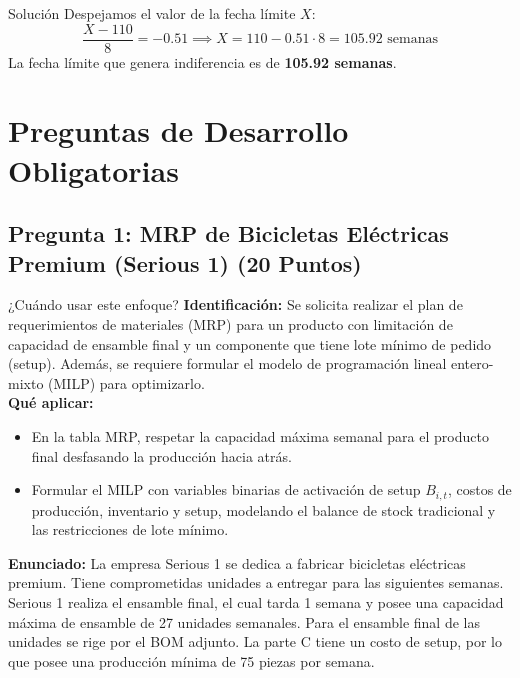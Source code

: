\documentclass[11pt, a4paper]{article}
\begin{document}
\begin{ejercicio}{Solución}
  Despejamos el valor de la fecha límite $X$:
  \begin{equation*}
    \frac{X - 110}{8} = -0.51 \implies X = 110 - 0.51 \cdot 8 = 105.92 \text{ semanas}
  \end{equation*}
  La fecha límite que genera indiferencia es de \textbf{105.92 semanas}.

\end{ejercicio}

\newpage

\section{Preguntas de Desarrollo Obligatorias}

\subsection*{Pregunta 1: MRP de Bicicletas Eléctricas Premium (Serious 1) (20 Puntos)}

  \begin{tipprueba}{¿Cuándo usar este enfoque?}
    \textbf{Identificación:} Se solicita realizar el plan de requerimientos de materiales (MRP) para un producto con limitación de capacidad de ensamble final y un componente que tiene lote mínimo de pedido (setup). Además, se requiere formular el modelo de programación lineal entero-mixto (MILP) para optimizarlo.\\
    \textbf{Qué aplicar:}
    \begin{itemize}
      \item En la tabla MRP, respetar la capacidad máxima semanal para el producto final desfasando la producción hacia atrás.
      \item Formular el MILP con variables binarias de activación de setup $B_{i,t}$, costos de producción, inventario y setup, modelando el balance de stock tradicional y las restricciones de lote mínimo.
    \end{itemize}
  \end{tipprueba}

  \textbf{Enunciado:}
  La empresa Serious 1 se dedica a fabricar bicicletas eléctricas premium. Tiene comprometidas unidades a entregar para las siguientes semanas. Serious 1 realiza el ensamble final, el cual tarda 1 semana y posee una capacidad máxima de ensamble de 27 unidades semanales. Para el ensamble final de las unidades se rige por el BOM adjunto. La parte C tiene un costo de setup, por lo que posee una producción mínima de 75 piezas por semana.
\end{document}
